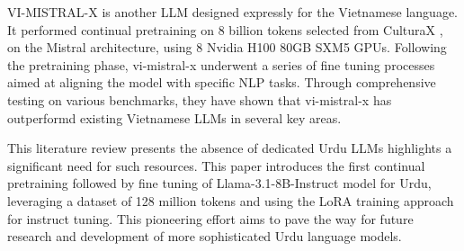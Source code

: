 VI-MISTRAL-X \citep{29} is another LLM designed expressly for the Vietnamese language. It performed continual pretraining on 8 billion tokens selected from CulturaX \citep{7}, on the Mistral architecture, using 8 Nvidia H100 80GB SXM5
GPUs. Following the pretraining phase, vi-mistral-x underwent a series of fine tuning processes aimed at aligning the model
with specific NLP tasks. Through comprehensive testing
on various benchmarks, they have shown that vi-mistral-x has  outperformd existing Vietnamese LLMs in several
key areas.

This literature review presents the absence of dedicated Urdu LLMs highlights a significant need for such resources. This paper introduces the first continual pretraining followed by fine tuning of Llama-3.1-8B-Instruct model for Urdu, leveraging a dataset of 128 million tokens and using the LoRA \citep{lora} training approach for instruct tuning. This pioneering effort aims to pave the way for future research and development of more sophisticated Urdu language models.